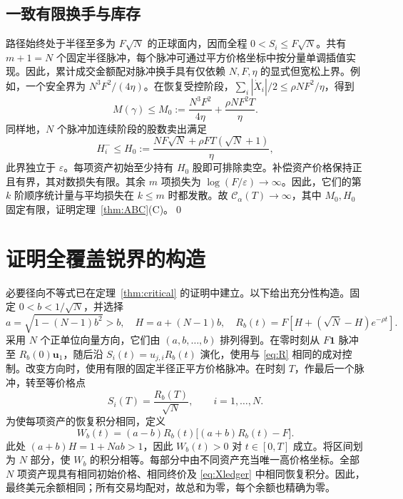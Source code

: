 \documentclass[11pt]{article}
\numberwithin{equation}{section}
\theoremstyle{definition}
\theoremstyle{remark}
\newcommand{\Cris}{\mathcal{C}}
\newcommand{\one}{\mathbf{1}}
\begin{document}
\subsection{一致有限换手与库存}
路径始终处于半径至多为 $F\sqrt N$ 的正球面内，因而全程 $0<S_i\le F\sqrt N$。共有 $m+1=N$ 个固定半径脉冲，每个脉冲可通过平方价格坐标中按分量单调插值实现。因此，累计成交金额配对脉冲换手具有仅依赖 $N,F,\eta$ 的显式但宽松上界。例如，一个安全界为 $N^3F^2/(4\eta)$。在恢复受控阶段，$\sum_i|\dot X_i|/2\le \rho NF^2/\eta$，得到
\begin{equation}\label{eq:uniformM}
M(\gamma)\le M_0:=\frac{N^3F^2}{4\eta}+\frac{\rho NF^2T}{\eta}.
\end{equation}
同样地，$N$ 个脉冲加连续阶段的股数卖出满足
\begin{equation}\label{eq:uniformH}
H_i^-\le H_0:=\frac{NF\sqrt N+\rho FT(\sqrt N+1)}\eta,
\end{equation}
此界独立于 $\varepsilon$。每项资产初始至少持有 $H_0$ 股即可排除卖空。补偿资产价格保持正且有界，其对数损失有限。其余 $m$ 项损失为 $\log(F/\varepsilon)\to\infty$。因此，它们的第 $k$ 阶顺序统计量与平均损失在 $k\le m$ 时都发散。故 $\Cris_\alpha(T)\to\infty$，其中 $M_0,H_0$ 固定有限，证明定理~\ref{thm:ABC}(C)。\qed

\section{证明全覆盖锐界的构造}\label{app:sharp}
必要径向不等式已在定理~\ref{thm:critical} 的证明中建立。以下给出充分性构造。固定 $0<b<1/\sqrt N$，并选择
\begin{equation}\label{eq:fullab}
a=\sqrt{1-(N-1)b^2}>b,
\quad H=a+(N-1)b,
\quad R_b(t)=F\left[H+(\sqrt N-H)e^{-\rho t}\right].
\end{equation}
采用 $N$ 个正单位向量方向，它们由 $(a,b,\ldots,b)$ 排列得到。在零时刻从 $F\one$ 脉冲至 $R_b(0)\bm u_1$，随后沿 $S_i(t)=u_{j,i}R_b(t)$ 演化，使用与 \eqref{eq:R} 相同的成对控制。改变方向时，使用有限的固定半径正平方价格脉冲。在时刻 $T$，作最后一个脉冲，转至等价格点
\begin{equation}\label{eq:fullend}
S_i(T)=\frac{R_b(T)}{\sqrt N},\qquad i=1,\ldots,N.
\end{equation}
为使每项资产的恢复积分相同，定义
\begin{equation}\label{eq:fullW}
W_b(t)=(a-b)R_b(t)\big[(a+b)R_b(t)-F\big].
\end{equation}
此处 $(a+b)H=1+Nab>1$，因此 $W_b(t)>0$ 对 $t\in[0,T]$ 成立。将区间划为 $N$ 部分，使 $W_b$ 的积分相等。每部分中由不同资产充当唯一高价格坐标。全部 $N$ 项资产现具有相同初始价格、相同终价及 \eqref{eq:Xledger} 中相同恢复积分。因此，最终美元余额相同；所有交易均配对，故总和为零，每个余额也精确为零。
\end{document}
